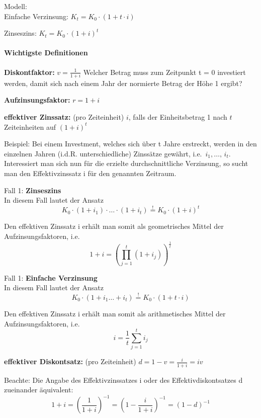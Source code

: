\documentclass[
]{article}
\begin{document}
Modell:\\

Einfache Verzinsung: \(K_t = K_0 \cdot (1 + t\cdot i)\)

Zinseszins: \(K_t = K_0 \cdot (1 + i)^t\)

\hypertarget{wichtigste-definitionen}{%
\paragraph{Wichtigste Definitionen}\label{wichtigste-definitionen}}

\textbf{Diskontfaktor:} \(v = \frac{1}{1+i}\) Welcher Betrag muss zum
Zeitpunkt t = 0 investiert werden, damit sich nach einem Jahr der
normierte Betrag der Höhe 1 ergibt?

\textbf{Aufzinsungsfaktor:} \(r = 1+i\)

\textbf{effektiver Zinssatz:} (pro Zeiteinheit) \(i\), falls der
Einheitsbetrag 1 nach \(t\) Zeiteinheiten auf \((1+i)^t\)

Beispiel: Bei einem Investment, welches sich über t Jahre erstreckt,
werden in den einzelnen Jahren (i.d.R. unterschiedliche) Zinssätze
gewährt, i.e.~\(i_1,\dots,\, i_t\). Interessiert man sich nun für die
erzielte durchschnittliche Verzinsung, so sucht man den Effektivzinssatz
i für den genannten Zeitraum.

Fall 1: \textbf{Zinseszins}\\
In diesem Fall lautet der Ansatz \[
    K_0 \cdot (1+i_1) \cdot \dots \cdot (1+i_t) \overset{!}{=}  K_0 \cdot (1+i)^t
  \]

Den effektiven Zinssatz i erhält man somit als geometrisches Mittel der
Aufzinsungsfaktoren, i.e. \[
    1+i = \left( \prod_{j=1}^t (1+i_j) \right)^{\frac{1}{t}}
  \]

Fall 1: \textbf{Einfache Verzinsung}\\
In diesem Fall lautet der Ansatz \[
    K_0 \cdot (1 + i_1 \dots + i_t) \overset{!}{=}  K_0 \cdot (1 + t \cdot i)
  \]

Den effektiven Zinssatz i erhält man somit als arithmetisches Mittel der
Aufzinsungsfaktoren, i.e. \[
    i = \frac{1}{t} \sum_{j=1}^t i_j
  \]

\textbf{effektiver Diskontsatz:} (pro Zeiteinheit)
\(d = 1 - v = \frac{i}{1+i} = iv\)

Beachte: Die Angabe des Effektivzinssatzes i oder des
Effektivdiskontsatzes d zueinander äquivalent:\\
\[
  1+i = \left(\frac{1}{1+i}\right)^{-1} = \left(1-\frac{i}{1+i}\right)^{-1} = (1-d)^{-1}
\]
\end{document}
